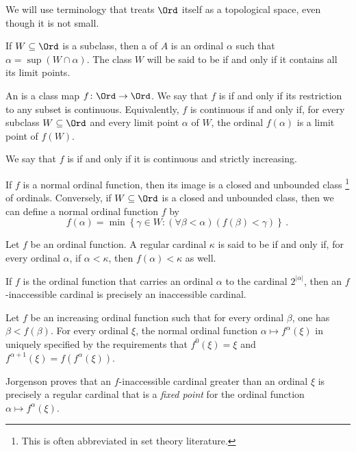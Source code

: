 We will use terminology 
that treats $ \Ord $ itself as a topological space,
even though it is not small.

\begin{definition}
	If $ W \subseteq \Ord $ is a subclass,
	then a  of $ A $ is
	an ordinal $ \alpha $ such that $ \alpha = \sup (W \cap \alpha) $.
	The class $ W $ will be said to be  if and only if
	it contains all its limit points.

	An  is a class map $ f \colon \Ord \to \Ord $.
	We say that $ f $ is  if and only if
	its restriction to any subset is continuous.
	Equivalently, $ f $ is continuous if and only if,
	for every subclass $ W \subseteq \Ord $
	and every limit point $ \alpha $ of $ W $,
	the ordinal $ f(\alpha) $ is a limit point of $ f(W) $.

	We say that $ f $ is  if and only if
	it is continuous and strictly increasing.
\end{definition}

\begin{nul}
	If $ f $ is a normal ordinal function,
	then its image is a closed and unbounded class%
	\footnote{This is often abbreviated  in
	set theory literature.}
	of ordinals.
	Conversely, if $ W \subseteq \Ord $ is a closed and unbounded class,
	then we can define a normal ordinal function $ f $ by
	\[
		f(\alpha) = \min \left\{ \gamma \in W : (\forall \beta < \alpha)(f(\beta) < \gamma) \right\} \period
	\]
\end{nul}

\begin{definition}
	Let $ f $ be an ordinal function.
	A regular cardinal $ \kappa $ is said to be
	 if and only if,
	for every ordinal $ \alpha$, if $ \alpha < \kappa $,
	then $ f(\alpha) < \kappa $ as well.
\end{definition}

\begin{eg}
	If $ f $ is the ordinal function that carries
	an ordinal $ \alpha $ to the cardinal $ 2^{|\alpha|} $,
	then an $ f $-inaccessible cardinal is precisely
	an inaccessible cardinal.
\end{eg}

\begin{nul}
	Let $ f $ be an increasing ordinal function
	such that for every ordinal $ \beta $, one has $ \beta < f(\beta) $.
	For every ordinal $ \xi $,
	the normal ordinal function $ \alpha \mapsto f^{\alpha}(\xi) $
	in uniquely specified by the requirements that
	$ f^0(\xi) = \xi $ and $ f^{\alpha + 1}(\xi) =f(f^{\alpha}(\xi)) $.

	Jorgenson proves that an $ f $-inaccessible cardinal
	greater than an ordinal $ \xi $
	is precisely a regular cardinal that is a \emph{fixed point}
	for the ordinal function $ \alpha \mapsto f^{\alpha}(\xi) $.
\end{nul}

